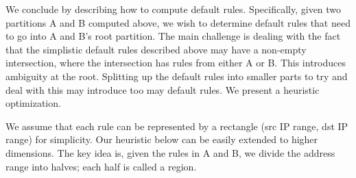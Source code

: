 \iffalse

We conclude by describing how to compute default rules. Specifically, given two
partitions A and B computed above, we wish to determine default rules that need
to go into A and B's root partition. The main challenge is dealing with the fact
that the simplistic default rules described above may have a non-empty
intersection, where the intersection has rules from either A or B. This
introduces ambiguity at the root. Splitting up the default rules into smaller
parts to try and deal with this may introduce too may default rules. We present
a heuristic optimization. 

We assume that each rule can be represented by a rectangle (src  IP range, dst
IP range) for simplicity. Our heuristic below can be easily extended to higher
dimensions. The key idea is, given the rules in A and B, we divide the
address range into halves; each half is called a region. 

